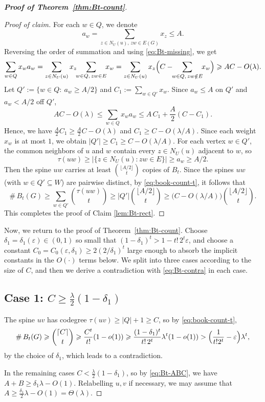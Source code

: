 \documentclass[10pt,a4paper]{amsart}
\renewcommand{\le}{\leqslant}
\renewcommand{\ge}{\geqslant}
\begin{document}
\begin{proof}[{\bf Proof of Theorem~\ref{thm:Bt-count}}]
\begin{proof}[Proof of claim]
For each $w\in Q$, we denote 
$$ a_w=\sum_{z\in N_U(u),\,zw\in E(G)}x_z\le A. $$ 
Reversing the
order of summation and using \eqref{eq:Bt-missing}, we get 
\[
   \sum_{w\in Q}x_w a_w
   =\sum_{z\in N_U(u)}x_z\!\!\sum_{w\in Q,\,zw\in E}\!\!x_w
   =\sum_{z\in N_U(u)}x_z\Bigl(C-\!\!\sum_{w\in Q,\,zw\notin E}\!\!x_w\Bigr)
   \ge AC-O(\lambda).
\]
Let $Q':=\{w\in Q:\ a_w\ge A/2\}$ and $C_1:=\sum_{w\in Q'}x_w$.  Since $a_w\le A$
on $Q'$ and $a_w<A/2$ off $Q'$,
$$ 
AC-O(\lambda)\le \sum_{w\in Q} x_w a_w \le  A\,C_1+\frac A2(C-C_1). 
$$ 
Hence, we have 
$\tfrac A2 C_1\ge\tfrac A2 C-O(\lambda)$ and $C_1\ge C-O(\lambda/A)$. Since each
weight $x_w$ is at most $1$, we obtain $|Q'|\ge C_1\ge C-O(\lambda/A)$.  For each vertex $w\in Q'$, the
common neighbors of $u$ and $w$ contain every $z\in N_U(u)$ adjacent to $w$, so
$$ \tau(uw)\ge |\{z\in N_U(u):zw\in E\}| \ge a_w\ge A/2. $$ 
Then the spine $uw$ carries
at least $\binom{\lfloor A/2\rfloor}{t}$ copies of $B_t$. Since the spines $uw$
(with $w\in Q'\subseteq W$) are pairwise distinct, by \eqref{eq:book-count-t}, 
it follows that 
\[
   \texttt{\#}\,B_t(G)\ge\sum_{w\in Q'}\binom{\tau(uw)}{t}
   \ge|Q'|\binom{\lfloor A/2\rfloor}{t}
   \ge\bigl(C-O(\lambda/A)\bigr)\binom{\lfloor A/2\rfloor}{t}. 
\]
This completes the proof of Claim \ref{lem:Bt-rect}. 
\end{proof}

Now, we return to the proof of Theorem~\ref{thm:Bt-count}.   
Choose $\delta_1=\delta_1(\varepsilon)\in(0,1)$ so
small that $(1-\delta_1)^t>1-t!\,2^t\varepsilon$,
and choose a constant
$C_0=C_0(\varepsilon,\delta_1)\ge 2(2/\delta_1)^t$
large enough to absorb the implicit constants in the $O(\cdot)$ terms below.
 We split into three cases according to the size of
$C$, and then we derive a contradiction with \eqref{eq:Bt-contra} in each case.

\subsection*{Case 1:  
$C\ge\tfrac\lambda2(1-\delta_1)$}   

The spine $uv$ has codegree
$\tau(uv)\ge|Q|+1\ge C$, so by \eqref{eq:book-count-t},
\[
   \texttt{\#}\,B_t(G)\ge\binom{\lceil C\rceil}{t}\ge\frac{C^t}{t!}(1-o(1))
   \ge\frac{(1-\delta_1)^t}{t!\,2^t}\lambda^t(1-o(1))
   >\Bigl(\frac1{t!2^t}-\varepsilon\Bigr)\lambda^t,
\]
by the choice of $\delta_1$, which leads to a contradiction.

\medskip 
In the remaining cases $C<\tfrac\lambda2(1-\delta_1)$, so by \eqref{eq:Bt-ABC}, we have 
$A+B\ge\delta_1\lambda-O(1)$. Relabelling $u,v$ if necessary, we may assume that 
$A\ge\tfrac{\delta_1}{2}\lambda-O(1)=\Theta(\lambda)$.


\end{proof}
\end{document}
